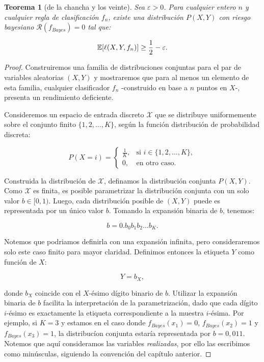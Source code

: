 \documentclass{report}
\newtheorem{thm}{Teorema}[section]
\begin{document}
\begin{thm}[de la chancha y los veinte]
Sea \(\varepsilon > 0\). Para cualquier entero \(n\) y cualquier 
regla de clasificación \(f_n\), existe una distribución \(P(X, Y)\) con riesgo bayesiano 
\(\mathcal{R}(f_{Bayes}) = 0\) tal que:

\[
\mathbb{E}[\ell(X,Y,f_n)] \geq \frac{1}{2} - \varepsilon.\newline
\]
\end{thm}

\begin{proof}

Construiremos una familia de distribuciones conjuntas para el par de variables aleatorias \((X, Y)\) y mostraremos que para al menos un 
elemento de esta familia, cualquier clasificador \(f_n\) -construido en base a $n$ puntos en $X$-, presenta un rendimiento deficiente.\newline

Consideremos un espacio de entrada 
discreto \(\mathcal{X}\) que se distribuye uniformemente sobre el conjunto finito \(\{1, 2, \dots, K\}\), 
según la función distribución de probabilidad discreta:

\[
P(X = i) = \begin{cases} 
\frac{1}{K}, & \text{si } i \in \{1, 2, \dots, K\}, \\ 
0, & \text{en otro caso}.
\end{cases}
\]


Construida la distribución de \(\mathcal{X}\), definamos la distribución conjunta \(P(X,Y)\). Como \(\mathcal{X}\) es finita,
es posible parametrizar la distribución conjunta con un solo valor
\(b \in [0,1)\). Luego, cada distribución posible de $(X,Y)$ puede es representada por un único valor \(b\).
Tomando la expansión binaria de $b$, tenemos:

\[
b = 0.b_0 b_1 b_2 \dots b_K.
\]

Notemos que podriamos definirla con una expansión infinita, pero consideraremos solo este caso finito para 
mayor claridad. Definimos entonces la etiqueta \(Y\) como función de \(X\):

\[
Y = b_X,
\]

donde \(b_X\) coincide con el \(X\)-ésimo dígito binario de \(b\). Utilizar la expansión binaria de $b$ facilita la interpretación
de la parametrización, dado que cada dígito $i$-ésimo es exactamente la etiqueta correspondiente a la muestra $i$-ésima.
Por ejemplo, si \(K=3\) y estamos en el caso donde  \(f_{Bayes}(x_1)=0\),  \(f_{Bayes}(x_2)=1\) y \(f_{Bayes}(x_3)=1\), 
la distribucíon conjunta estaría representada por $b=0,011$. Notemos que aquí consideramos las variables \emph{realizadas}, por ello
las escribimos como minúsculas, siguiendo la convención del capítulo anterior.\newline



\end{proof}
\end{document}
